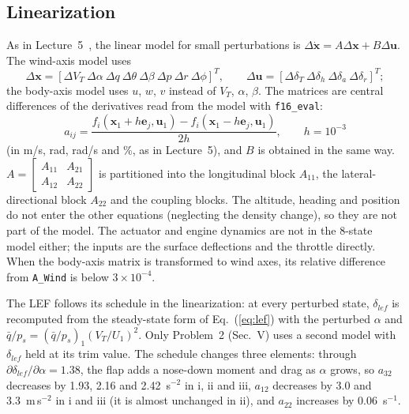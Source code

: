 \documentclass[conf]{new-aiaa}
\begin{document}
\subsection{Linearization}
As in Lecture~5~\cite{lec5}, the linear model for small perturbations is $\Delta\dot{\mathbf x}=A\Delta\mathbf x+B\Delta\mathbf u$. The wind-axis model uses
\begin{equation}
\Delta\mathbf x=[\Delta V_T\ \Delta\alpha\ \Delta q\ \Delta\theta\ \Delta\beta\ \Delta p\ \Delta r\ \Delta\phi]^T,\qquad
\Delta\mathbf u=[\Delta\delta_T\ \Delta\delta_h\ \Delta\delta_a\ \Delta\delta_r]^T;
\end{equation}
the body-axis model uses $u$, $w$, $v$ instead of $V_T$, $\alpha$, $\beta$. The matrices are central differences of the derivatives read from the model with \texttt{f16\_eval}:
\begin{equation}
a_{ij}=\frac{f_i(\mathbf x_1+h\mathbf e_j,\mathbf u_1)-f_i(\mathbf x_1-h\mathbf e_j,\mathbf u_1)}{2h},\qquad h=10^{-3}
\end{equation}
(in m/s, rad, rad/s and \%, as in Lecture~5), and $B$ is obtained in the same way. $A=\begin{bmatrix}A_{11}&A_{21}\\A_{12}&A_{22}\end{bmatrix}$ is partitioned into the longitudinal block $A_{11}$, the lateral-directional block $A_{22}$ and the coupling blocks. The altitude, heading and position do not enter the other equations (neglecting the density change), so they are not part of the model. The actuator and engine dynamics are not in the 8-state model either; the inputs are the surface deflections and the throttle directly. When the body-axis matrix is transformed to wind axes, its relative difference from \texttt{A\_Wind} is below $3\times10^{-4}$.

The LEF follows its schedule in the linearization: at every perturbed state, $\delta_{lef}$ is recomputed from the steady-state form of Eq.~(\ref{eq:lef}) with the perturbed $\alpha$ and $\bar q/p_s=(\bar q/p_s)_1(V_T/U_1)^2$. Only Problem~2 (Sec.~V) uses a second model with $\delta_{lef}$ held at its trim value. The schedule changes three elements: through $\partial\delta_{lef}/\partial\alpha=1.38$, the flap adds a nose-down moment and drag as $\alpha$ grows, so $a_{32}$ decreases by 1.93, 2.16 and 2.42~s$^{-2}$ in i, ii and iii, $a_{12}$ decreases by 3.0 and 3.3~m\,s$^{-2}$ in i and iii (it is almost unchanged in ii), and $a_{22}$ increases by 0.06~s$^{-1}$.
\end{document}
